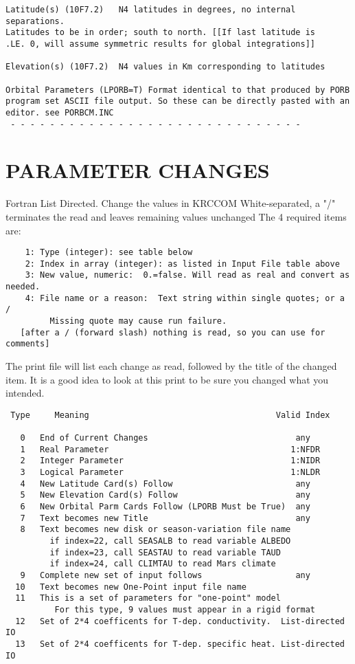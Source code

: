 \documentclass[draft]{article}  %
\begin{document}
\begin{verbatim}
Latitude(s) (10F7.2)   N4 latitudes in degrees, no internal separations.
Latitudes to be in order; south to north. [[If last latitude is
.LE. 0, will assume symmetric results for global integrations]]

Elevation(s) (10F7.2)  N4 values in Km corresponding to latitudes

Orbital Parameters (LPORB=T) Format identical to that produced by PORB
program set ASCII file output. So these can be directly pasted with an
editor. see PORBCM.INC
 - - - - - - - - - - - - - - - - - - - - - - - - - - - - - - 
\end{verbatim}

\section{PARAMETER CHANGES \label{pc}}

Fortran List Directed.  Change the values in KRCCOM	
White-separated, a "/" terminates the read and leaves remaining values unchanged
The 4 required items are:
\vspace{-3.mm} 
\begin{verbatim}
    1: Type (integer): see table below
    2: Index in array (integer): as listed in Input File table above
    3: New value, numeric:  0.=false. Will read as real and convert as needed.
    4: File name or a reason:  Text string within single quotes; or a /
         Missing quote may cause run failure.
   [after a / (forward slash) nothing is read, so you can use for comments]
\end{verbatim}
The print file will list each change as read, followed by the title of the
changed item. It is a good idea to look at this print to be sure you changed
what you intended.
\vspace{-3.mm} 
\begin{verbatim}
 Type     Meaning                                      Valid Index

   0   End of Current Changes                              any
   1   Real Parameter                                     1:NFDR
   2   Integer Parameter                                  1:NIDR
   3   Logical Parameter                                  1:NLDR
   4   New Latitude Card(s) Follow                         any
   5   New Elevation Card(s) Follow                        any
   6   New Orbital Parm Cards Follow (LPORB Must be True)  any
   7   Text becomes new Title                              any
   8   Text becomes new disk or season-variation file name
         if index=22, call SEASALB to read variable ALBEDO
         if index=23, call SEASTAU to read variable TAUD
         if index=24, call CLIMTAU to read Mars climate
   9   Complete new set of input follows                   any
  10   Text becomes new One-Point input file name
  11   This is a set of parameters for "one-point" model 
          For this type, 9 values must appear in a rigid format
  12   Set of 2*4 coefficents for T-dep. conductivity.  List-directed IO
  13   Set of 2*4 coefficents for T-dep. specific heat. List-directed IO 
\end{verbatim}
\end{document}
